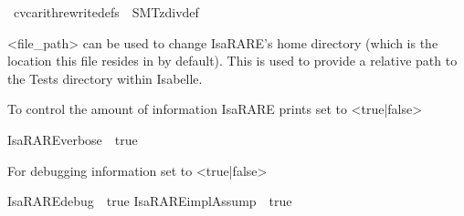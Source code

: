 \begin{isabellebody}
{\isacartoucheclose}%
\endisatagML
{\isafoldML}%
%
\isadelimML
%
\endisadelimML
\isanewline
\isanewline
{}\isamarkupfalse%
\ cvc{\isacharunderscore}{\kern0pt}arith{\isacharunderscore}{\kern0pt}rewrite{\isacharunderscore}{\kern0pt}defs\ {\isacharequal}{\kern0pt}\ SMT{\isachardot}{\kern0pt}z{}div{\isacharunderscore}{\kern0pt}def%
\isadelimdocument
%
\endisadelimdocument
%
\isatagdocument
%
\isamarkuptrue%
%
\isamarkuptrue%
%
\endisatagdocument
{\isafolddocument}%
%
\isadelimdocument
%
\endisadelimdocument
%
\begin{isamarkuptext}%
<file\_path> can be used to change IsaRARE's home directory (which is the
location this file resides in by default). This is used to provide a relative path to the Tests
directory within Isabelle.%
\end{isamarkuptext}\isamarkuptrue%
%
\isadelimdocument
%
\endisadelimdocument
%
\isatagdocument
%
\isamarkuptrue%
%
\endisatagdocument
{\isafolddocument}%
%
\isadelimdocument
%
\endisadelimdocument
%
\begin{isamarkuptext}%
To control the amount of information IsaRARE prints set  to
<true|false>%
\end{isamarkuptext}\isamarkuptrue%
\isamarkupfalse%
{\isacharbrackleft}{\kern0pt}{\isacharbrackleft}{\kern0pt}IsaRARE{\isacharunderscore}{\kern0pt}verbose\ {\isacharequal}{\kern0pt}\ true{\isacharbrackright}{\kern0pt}{\isacharbrackright}{\kern0pt}%
\begin{isamarkuptext}%
For debugging information set  to <true|false>%
\end{isamarkuptext}\isamarkuptrue%
\isamarkupfalse%
{\isacharbrackleft}{\kern0pt}{\isacharbrackleft}{\kern0pt}IsaRARE{\isacharunderscore}{\kern0pt}debug\ {\isacharequal}{\kern0pt}\ true{\isacharbrackright}{\kern0pt}{\isacharbrackright}{\kern0pt}%
\isadelimdocument
%
\endisadelimdocument
%
\isatagdocument
%
\isamarkuptrue%
%
\endisatagdocument
{\isafolddocument}%
%
\isadelimdocument
%
\endisadelimdocument
{}\isamarkupfalse%
{\isacharbrackleft}{\kern0pt}{\isacharbrackleft}{\kern0pt}IsaRARE{\isacharunderscore}{\kern0pt}implAssump\ {\isacharequal}{\kern0pt}\ true{\isacharbrackright}{\kern0pt}{\isacharbrackright}{\kern0pt}\ \isanewline
{}\isamarkupfalse%

\end{isabellebody}
